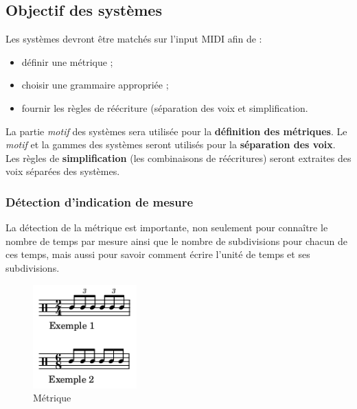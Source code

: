 \subsection*{Objectif des systèmes}
Les systèmes devront être matchés sur l’input MIDI afin de :
\begin{itemize}
	\item définir une métrique ;
	\item choisir une grammaire appropriée ;
	\item fournir les règles de réécriture (séparation des voix et simplification.\\
\end{itemize}

La partie \textit{motif} des systèmes sera utilisée pour la \textbf{définition des métriques}. 
Le \textit{motif} et la gammes des systèmes seront utilisés pour la \textbf{séparation des voix}. 
Les règles de \textbf{simplification} (les combinaisons de réécritures) seront extraites des voix séparées des systèmes.

\subsubsection{Détection d’indication de mesure}
La détection de la métrique est importante, 
non seulement pour connaître le nombre de temps par mesure ainsi que le nombre de subdivisions pour chacun de ces temps, mais aussi pour savoir comment écrire l’unité de temps et ses subdivisions.

\begin{figure}[h]
	\centering
	\includegraphics[height=40mm, width=40mm]{z_images/3_methodes/2_systemes/0_simple_VS_complexe.png}
	\caption{Métrique}
	\label{subdivisions}
\end{figure} %

